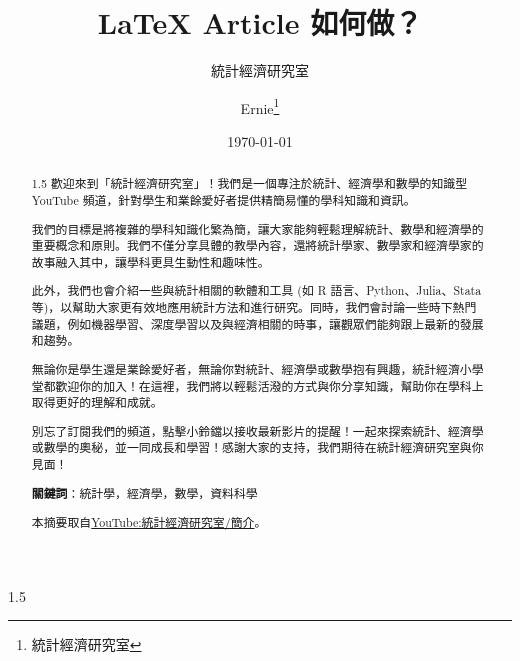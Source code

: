 \documentclass[utf8,12pt]{article} %
\title{\LaTeX{}  Article 如何做？}
\author{統計經濟研究室 \and Ernie\thanks{統計經濟研究室}}
\date{\today}
\begin{document}

%
\maketitle 
%
%
\begin{abstract}\fontsize{12}{20pt}
\begin{spacing}{1.5}
歡迎來到「統計經濟研究室」！我們是一個專注於統計、經濟學和數學的知識型 YouTube 頻道，針對學生和業餘愛好者提供精簡易懂的學科知識和資訊。

我們的目標是將複雜的學科知識化繁為簡，讓大家能夠輕鬆理解統計、數學和經濟學的重要概念和原則。我們不僅分享具體的教學內容，還將統計學家、數學家和經濟學家的故事融入其中，讓學科更具生動性和趣味性。

此外，我們也會介紹一些與統計相關的軟體和工具 (如 R 語言、Python、Julia、Stata 等)，以幫助大家更有效地應用統計方法和進行研究。同時，我們會討論一些時下熱門議題，例如機器學習、深度學習以及與經濟相關的時事，讓觀眾們能夠跟上最新的發展和趨勢。

無論你是學生還是業餘愛好者，無論你對統計、經濟學或數學抱有興趣，統計經濟小學堂都歡迎你的加入！在這裡，我們將以輕鬆活潑的方式與你分享知識，幫助你在學科上取得更好的理解和成就。

別忘了訂閱我們的頻道，點擊小鈴鐺以接收最新影片的提醒！一起來探索統計、經濟學或數學的奧秘，並一同成長和學習！感謝大家的支持，我們期待在統計經濟研究室與你見面！

\bigskip
\noindent
\textbf{關鍵詞}：統計學，經濟學，數學，資料科學

\bigskip
\noindent
本摘要取自\href{https://www.youtube.com/@StatEconLab/about}{YouTube:統計經濟研究室/簡介}。
\end{spacing}
\end{abstract}
%
%
\newpage
\fontsize{12}{20pt}
\begin{spacing}{1.5}
\tableofcontents
%
\newpage
\listoffigures
%
\newpage
\listoftables
%
\end{spacing}
%
%
\newpage
{} %
\end{document}
